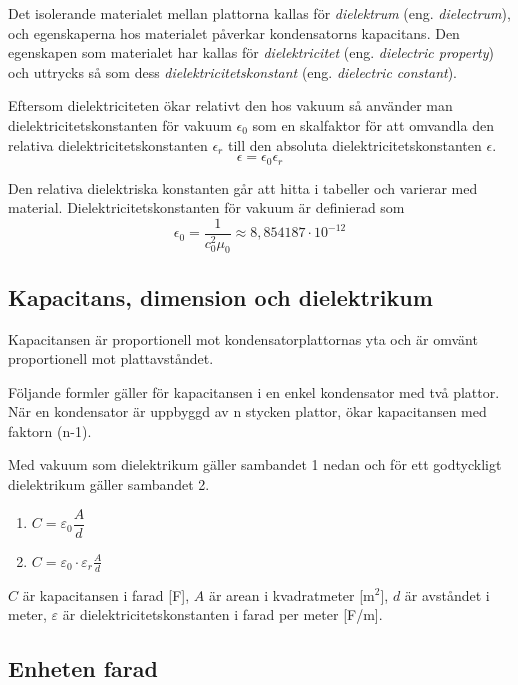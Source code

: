 Det isolerande materialet mellan plattorna kallas för \emph{dielektrum}
(eng. \emph{dielectrum}), och egenskaperna hos materialet påverkar kondensatorns
kapacitans.
Den egenskapen som materialet har kallas för \emph{dielektricitet}
(eng. \emph{dielectric property}) och uttrycks så som dess
\emph{dielektricitetskonstant} (eng. \emph{dielectric constant}).

Eftersom dielektriciteten ökar relativt den hos vakuum så använder man
dielektricitetskonstanten för vakuum \(\epsilon_0\) som en skalfaktor för att
omvandla den relativa dielektricitetskonstanten \(\epsilon_r\) till den
absoluta dielektricitetskonstanten \(\epsilon\).
\[
  \epsilon = \epsilon_0\epsilon_r
\]

Den relativa dielektriska konstanten går att hitta i tabeller och varierar
med material. Dielektricitetskonstanten för vakuum är definierad som
\[
  \epsilon_0 = \dfrac{1}{c_0^2\mu_0} \approx 8,854187 \cdot 10^{-12}
\]

\subsection{Kapacitans, dimension och dielektrikum}

Kapacitansen är proportionell mot kondensatorplattornas yta och är omvänt 
proportionell mot plattavståndet.

Följande formler gäller för kapacitansen i en enkel kondensator med två
plattor. När en kondensator är uppbyggd av n stycken plattor, ökar kapacitansen
med faktorn (n-1).

Med vakuum som dielektrikum gäller sambandet 1 nedan och för ett godtyckligt
dielektrikum gäller sambandet 2.

\begin{enumerate}
  \item \(C = \varepsilon _0 \dfrac{A}{d}\)
  \item \(C = \varepsilon _0 \cdot \varepsilon _r \frac{A}{d}\)
\end{enumerate}

\(C\) är kapacitansen i farad [F], \(A\) är arean i kvadratmeter [m$^2$], $d$ är
avståndet i meter, $\varepsilon$ är dielektricitetskonstanten i farad per meter
[F/m].

\subsection{Enheten farad}

